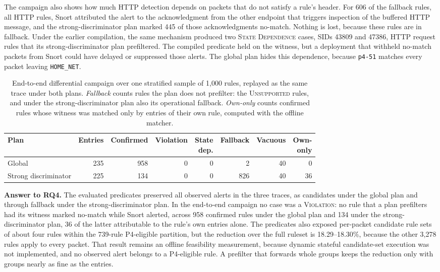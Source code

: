 \documentclass{article}
\begin{document}
The campaign also shows how much HTTP detection depends on packets that do
not satisfy a rule's header. For 606 of the fallback rules, all HTTP rules,
Snort attributed the alert to the acknowledgment from the other endpoint
that triggers inspection of the buffered HTTP message, and the
strong-discriminator plan marked 445 of those acknowledgments no-match. Nothing is lost, because
these rules are in fallback. Under the earlier compilation, the same
mechanism produced two \textsc{State Dependence} cases, SIDs 43809 and
47386, HTTP request rules that its strong-discriminator plan prefiltered.
The compiled predicate held on the witness, but a deployment that withheld
no-match packets from Snort could have delayed or suppressed those alerts.
The global plan hides this dependence, because \texttt{p4-51} matches every
packet leaving \texttt{HOME\_NET}.

\begin{table}[h]
\centering
\scriptsize
\setlength{\tabcolsep}{3pt}
\caption{End-to-end differential campaign over one stratified sample of 1,000
rules, replayed as the same trace under both plans. \emph{Fallback} counts
rules the plan does not prefilter: the \textsc{Unsupported} rules, and under
the strong-discriminator plan also its operational fallback. \emph{Own-only}
counts confirmed rules whose witness was matched only by entries of their
own rule, computed with the offline matcher.}
\label{tab:campaign}
\begin{tabular}{lrrrrrrr}
\toprule
Plan & Entries & Confirmed & Violation & \shortstack{State\\dep.} & Fallback & Vacuous & \shortstack{Own-\\only} \\
\midrule
Global & 235 & 958 & 0 & 0 & 2 & 40 & 0 \\
Strong discriminator & 225 & 134 & 0 & 0 & 826 & 40 & 36 \\
\bottomrule
\end{tabular}
\end{table}

\noindent\textbf{Answer to RQ4.} The evaluated predicates preserved all
observed alerts in the three traces, as candidates under the global plan and
through fallback under the strong-discriminator plan. In the end-to-end
campaign no case was a \textsc{Violation}: no rule that a plan prefilters
had its witness marked no-match while Snort alerted, across 958 confirmed
rules under the global plan and 134 under the strong-discriminator plan, 36
of the latter attributable to the rule's own entries alone. The predicates
also exposed per-packet candidate rule sets of about four rules within the
739-rule P4-eligible partition, but the reduction over the full ruleset is
18.29--18.30\%, because the other 3,278 rules apply to every packet. That
result remains an offline feasibility measurement, because dynamic stateful
candidate-set execution was not implemented, and no observed alert belongs
to a P4-eligible rule. A prefilter that forwards whole groups keeps the
reduction only with groups nearly as fine as the entries.
\end{document}
